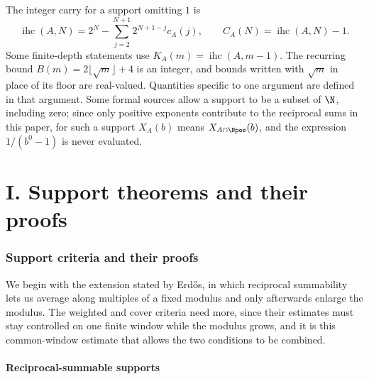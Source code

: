 The integer carry for a support omitting $1$ is
\[
 \operatorname{ihc}(A,N)=2^N-
 \sum_{j=2}^{N+1}2^{N+1-j}c_A(j),\qquad
 C_A(N)=\operatorname{ihc}(A,N)-1.
\]
Some finite-depth statements use $K_A(m)=\operatorname{ihc}(A,m-1)$.
The recurring bound $B(m)=2\lfloor\sqrt m\rfloor+4$ is an integer,
and bounds written with $\sqrt m$ in place of its floor are real-valued.
Quantities specific to one argument are defined in that argument. Some
formal sources allow a support to be a subset of $\N$, including zero;
since only positive exponents contribute to the reciprocal sums in this
paper, for such a support $X_A(b)$ means $X_{A\cap\Npos}(b)$, and the
expression $1/(b^0-1)$ is never evaluated.

\clearpage
\tableofcontents
\clearpage
%

\clearpage
\part*{I. Support theorems and their proofs}
\section{Support criteria and their proofs}
\label{sec:257-problem}
We begin with the extension stated by Erd\H{o}s, in which reciprocal
summability lets us average along multiples of a fixed modulus and only
afterwards enlarge the modulus. The weighted and cover criteria need
more, since their estimates must stay controlled on one finite window
while the modulus grows, and it is this common-window estimate that
allows the two conditions to be combined.


\subsection{Reciprocal-summable supports}

